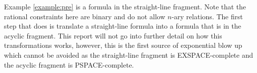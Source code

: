 Example \ref{example:pre} is a formula in the straight-line fragment.
Note that the rational constraints here are binary and do not allow $n$-ary relations.
The first step that \sloth does is translate a straight-line formula into a formula that is in the acyclic fragment.
This report will not go into further detail on how this transformations works, however, this is the first source of exponential blow up which cannot be avoided as the straight-line fragment is EXSPACE-complete and the acyclic fragment is PSPACE-complete.

